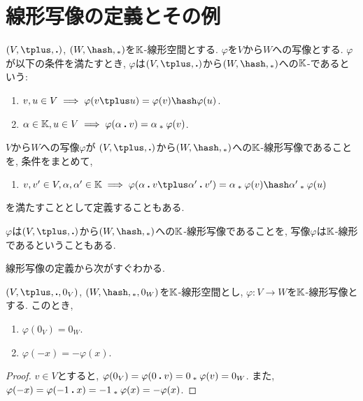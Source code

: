 \section{線形写像の定義とその例}
\label{sec:linmap:def}
\begin{definition}
  $(V,\plus,\act)$, $(W,\pplus,\aact)$を$\mathbb{K}$-線形空間とする.
  $\varphi$を$V$から$W$への写像とする.
  $\varphi$が以下の条件を満たすとき,
  $\varphi$は$(V,\plus,\act)$から$(W,\pplus,\aact)$への$\mathbb{K}$-であるという:
  \begin{enumerate}
    \item $v,u\in V\implies \varphi(v\plus u)=\varphi(v)\pplus\varphi(u)$.
    \item $\alpha\in \mathbb{K}, u\in V\implies \varphi(\alpha\mathbin{\boldsymbol{.}} v)=\alpha\mathbin{{}_\ast}\varphi(v)$.
  \end{enumerate}
\end{definition}

\begin{remark}
  $V$から$W$への写像$\varphi$が
  $(V,\plus,\act)$から$(W,\pplus,\aact)$への$\mathbb{K}$-線形写像であることを,
  条件をまとめて,
  \begin{enumerate}
    \item $v,v'\in V, \alpha,\alpha'\in\KK\implies \varphi(\alpha\act v\plus \alpha'\act v')=\alpha\aact \varphi(v)\pplus \alpha'\aact\varphi(u)$
  \end{enumerate}
  を満たすこととして定義することもある.
\end{remark}

\begin{remark}
  $\varphi$は$(V,\plus,\act)$から$(W,\pplus,\aact)$への$\mathbb{K}$-線形写像であることを,
  写像$\varphi$は$\mathbb{K}$-線形であるということもある.
\end{remark}

線形写像の定義から次がすぐわかる.
\begin{prop}
  $(V,\plus,\act,0_V)$, $(W,\pplus,\aact,0_W)$を$\mathbb{K}$-線形空間とし,
  $\varphi\colon V\to W$を$\mathbb{K}$-線形写像とする.
  このとき,
  \begin{enumerate}
    \item $\varphi(0_V)=0_W$.
    \item $\varphi(-x)=-\varphi(x)$.
  \end{enumerate}
\end{prop}
\begin{proof}
$v\in V$とすると,
$\varphi(0_V)=\varphi(0\mathbin{\boldsymbol{.}} v)=0\mathbin{{}_\ast} \varphi(v)=0_W$.
また,
$\varphi(-x)=\varphi(-1\mathbin{\boldsymbol{.}} x)=-1\mathbin{{}_\ast} \varphi(x)=-\varphi(x)$.
\end{proof}


